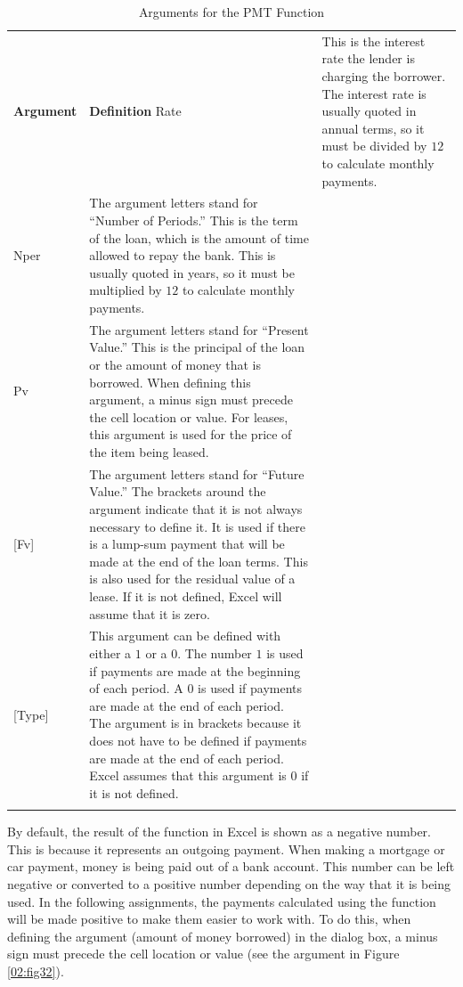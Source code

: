 \begin{table}[H]
	{\small
		\begin{longtable}{L{0.75in}L{3.50in}} %
			\textbf{Argument} & \textbf{Definition} \endhead
			\hline
			Rate & This is the interest rate the lender is charging the borrower. The interest rate is usually quoted in annual terms, so it must be divided by $ 12 $ to calculate monthly payments.\\
			Nper & The argument letters stand for ``Number of Periods.'' This is the term of the loan, which is the amount of time allowed to repay the bank. This is usually quoted in years, so it must be multiplied by $ 12 $ to calculate monthly payments.\\
			Pv & The argument letters stand for ``Present Value.'' This is the principal of the loan or the amount of money that is borrowed. When defining this argument, a minus sign must precede the cell location or value. For leases, this argument is used for the price of the item being leased.\\
			{[Fv]} & The argument letters stand for ``Future Value.'' The brackets around the argument indicate that it is not always necessary to define it. It is used if there is a lump-sum payment that will be made at the end of the loan terms. This is also used for the residual value of a lease. If it is not defined, Excel will assume that it is zero.\\
			{[Type]} & This argument can be defined with either a $ 1 $ or a $ 0 $. The number $ 1 $ is used if payments are made at the beginning of each period. A $ 0 $ is used if payments are made at the end of each period. The argument is in brackets because it does not have to be defined if payments are made at the end of each period. Excel assumes that this argument is $ 0 $ if it is not defined.\\
			\caption{Arguments for the PMT Function}
			\label{02:tab06}
		\end{longtable}
	} %
\end{table}

By default, the result of the  function in Excel is shown as a negative number. This is because it represents an outgoing payment. When making a mortgage or car payment, money is being paid out of a bank account. This number can be left negative or converted to a positive number depending on the way that it is being used. In the following assignments, the payments calculated using the  function will be made positive to make them easier to work with. To do this, when defining the  argument (amount of money borrowed) in the  dialog box, a minus sign must precede the cell location or value (see the  argument in Figure \ref{02:fig32}).

